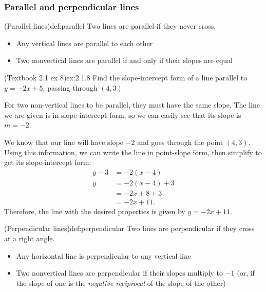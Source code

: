 \documentclass{article}
\begin{document}
\subsubsection{Parallel and perpendicular lines}

\begin{definition}{(Parallel lines)}{def:parallel}
    Two lines are parallel if they never cross.
    \begin{itemize}
        \item Any vertical lines are parallel to each other
        \item Two nonvertical lines are parallel if and only if their slopes are equal
    \end{itemize}
\end{definition}

\begin{example}{(Textbook 2.1 ex 8)}{ex:2.1.8}
    Find the slope-intercept form of a line parallel to $y=-2x+5$, passing through $(4,3)$
\end{example}
\begin{solution}
    For two non-vertical lines to be parallel, they must have the same slope. The line we are given is in slope-intercept form, so we can easily see that its slope is $m=-2$.

    We know that our line will have slope $-2$ and goes through the point $(4,3)$. Using this information, we can write the line in point-slope form, then simplify to get its slope-intercept form:
    \begin{align*}
        y-3&=-2(x-4)\\
        y&=-2(x-4)+3\\
        &=-2x+8+3\\
        &=-2x+11.
    \end{align*}
    Therefore, the line with the desired properties is given by $y=-2x+11$.
\end{solution}

\begin{definition}{(Perpendicular lines)}{def:perpendicular}
    Two lines are perpendicular if they cross at a right angle.
    \begin{itemize}
        \item Any horizontal line is perpendicular to any vertical line
        \item Two nonvertical lines are perpendicular if their slopes multiply to $-1$ (or, if the slope of one is the {\it negative reciprocal} of the slope of the other)
    \end{itemize}
\end{definition}
\end{document}
